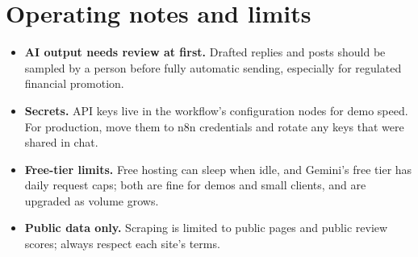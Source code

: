 \documentclass[11pt,a4paper]{article}
\begin{document}
\section{Operating notes and limits}
\begin{itemize}
  \item \textbf{AI output needs review at first.} Drafted replies and posts should be sampled by a person before fully automatic sending, especially for regulated financial promotion.
  \item \textbf{Secrets.} API keys live in the workflow's configuration nodes for demo speed. For production, move them to n8n credentials and rotate any keys that were shared in chat.
  \item \textbf{Free-tier limits.} Free hosting can sleep when idle, and Gemini's free tier has daily request caps; both are fine for demos and small clients, and are upgraded as volume grows.
  \item \textbf{Public data only.} Scraping is limited to public pages and public review scores; always respect each site's terms.
\end{itemize}
\end{document}
